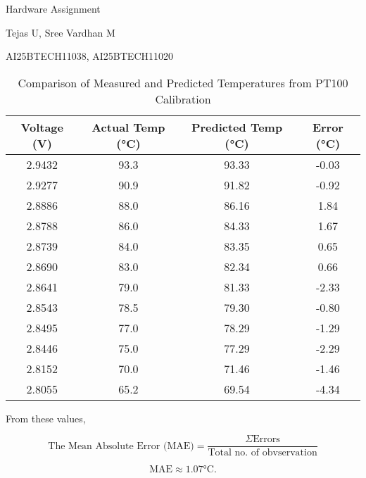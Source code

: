 \documentclass{article}
\begin{document}
\begin{center}
    \Huge{Hardware Assignment}
\end{center}
\begin{center}
    \Large{Tejas U, Sree Vardhan M}
\end{center}

\begin{center}
    \Large{AI25BTECH11038, AI25BTECH11020}
\end{center}

\begin{table}[h!]
\centering
\begin{tabular}{|c|c|c|c|}
\hline
\textbf{Voltage (V)} & \textbf{Actual Temp (°C)} & \textbf{Predicted Temp (°C)} & \textbf{Error (°C)} \\ 
\hline
2.9432 & 93.3 & 93.33 & -0.03 \\
2.9277 & 90.9 & 91.82 & -0.92 \\
2.8886 & 88.0 & 86.16 & 1.84 \\
2.8788 & 86.0 & 84.33 & 1.67 \\
2.8739 & 84.0 & 83.35 & 0.65 \\
2.8690 & 83.0 & 82.34 & 0.66 \\
2.8641 & 79.0 & 81.33 & -2.33 \\
2.8543 & 78.5 & 79.30 & -0.80 \\
2.8495 & 77.0 & 78.29 & -1.29 \\
2.8446 & 75.0 & 77.29 & -2.29 \\
2.8152 & 70.0 & 71.46 & -1.46 \\
2.8055 & 65.2 & 69.54 & -4.34 \\
\hline
\end{tabular}
\caption{Comparison of Measured and Predicted Temperatures from PT100 Calibration}
\label{tab:pt100_calibration}
\end{table}

From these values,

\begin{equation}
    \text{The Mean Absolute Error (MAE)} = \frac{\Sigma \text{Errors}}{\text{Total no. of obvservation}}
\end{equation}

\begin{equation}
    \text{MAE} \approx 1.07 \text{°C}.
\end{equation}
\end{document}
